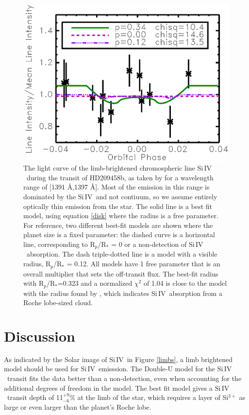 \documentclass[twocolumn]{emulateapj}
\newcommand{\siIV}{\ensuremath{\mathrm{Si}\,\scriptstyle \mathrm{IV}}}
\begin{document}

\begin{figure}[!ht]
\begin{center}
\includegraphics[width=0.5 \textwidth]{hd209458.eps}
\caption{The light curve of the limb-brightened chromospheric line \siIV\ during the transit of HD209458b, as taken by \citet{vidmad} for a wavelength range of [1391 \AA,1397 \AA]. Most of the emission in this range is dominated by the \siIV\ and not contiuum, so we assume entirely optically thin emission from the star. The solid line is a best fit model, using equation \ref{disk} where the radius is a free parameter. For reference, two different best-fit models are shown where the planet size is a fixed parameter: the dashed curve is a horizontal line, corresponding to R$_p$/R$_*$ = 0 or a non-detection of \siIV\ absorption. The dash triple-dotted line is a model with a visible radius, R$_p$/R$_*$ = 0.12. All models have 1 free parameter that is an overall multiplier that sets the off-transit flux. The best-fit radius with R$_p$/R$_*$=0.323 and a normalized $\chi^2$ of 1.04 is close to the model with the radius found by \citet{vidmad}, which indicates \siIV\ absorption from a Roche lobe-sized cloud. }
\end{center}
\label{lightc}
\end{figure}

\section{Discussion} \label{discuss}

As indicated by the Solar image of \siIV\ in Figure \ref{limbs}, a limb brightened model should be used for \siIV\ emisssion. The Double-U model for the \siIV\ transit fits the data better than a non-detection, even when accounting for the additional degrees of freedom in the model. The best fit model gives a \siIV\ transit depth of 11$^{+9}_{-6}$\% at the limb  of the star, which requires a layer of Si$^{3+}$ as large or even larger than the planet's Roche lobe.
\end{document}
